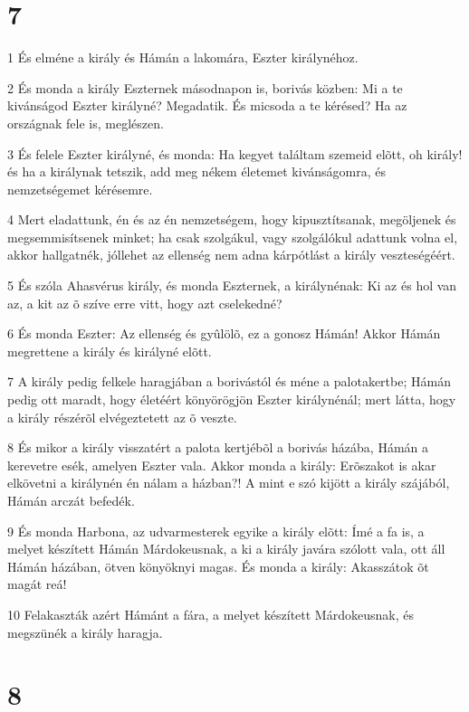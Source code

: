 \chapter{7}

\par 1 És elméne a király és Hámán a lakomára, Eszter királynéhoz.
\par 2 És monda a király Eszternek másodnapon is, borivás közben: Mi a te kivánságod Eszter királyné? Megadatik. És micsoda a te kérésed? Ha az országnak fele is, meglészen.
\par 3 És felele Eszter királyné, és monda: Ha kegyet találtam szemeid elõtt, oh király! és ha a királynak tetszik, add meg nékem életemet kivánságomra, és nemzetségemet kérésemre.
\par 4 Mert eladattunk, én és az én nemzetségem, hogy kipusztítsanak, megöljenek és megsemmisítsenek minket; ha csak szolgákul, vagy szolgálókul adattunk volna el, akkor hallgatnék, jóllehet az ellenség nem adna kárpótlást a király veszteségéért.
\par 5 És szóla Ahasvérus király, és monda Eszternek, a királynénak: Ki az és hol van az, a kit az õ szíve erre vitt, hogy azt cselekedné?
\par 6 És monda Eszter: Az ellenség és gyûlölõ, ez a gonosz Hámán! Akkor Hámán megrettene a király és királyné elõtt.
\par 7 A király pedig felkele haragjában a borivástól és méne a palotakertbe; Hámán pedig ott maradt, hogy életéért könyörögjön Eszter királynénál; mert látta, hogy a király részérõl elvégeztetett az õ veszte.
\par 8 És mikor a király visszatért a palota kertjébõl a borivás házába, Hámán a kerevetre esék, amelyen Eszter vala. Akkor monda a király: Erõszakot is akar elkövetni a királynén én nálam a házban?! A mint e szó kijött a király szájából, Hámán arczát befedék.
\par 9 És monda Harbona, az udvarmesterek egyike a király elõtt: Ímé a fa is, a melyet készített Hámán Márdokeusnak, a ki a király javára  szólott vala, ott áll Hámán házában, ötven könyöknyi magas. És monda a király: Akasszátok õt magát reá!
\par 10 Felakaszták azért Hámánt a fára, a melyet készített Márdokeusnak, és megszünék a király haragja.

\chapter{8}

